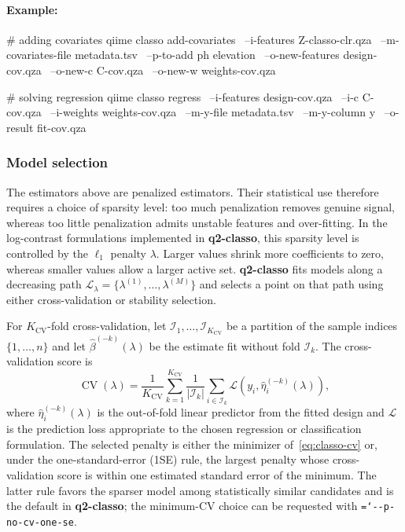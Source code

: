 \documentclass[11pt,a4paper]{article}
\newcommand{\code}[1]{\allowbreak\texttt{\hyphenchar\font=`\-\relax #1}}
\newcommand{\pkg}[1]{\textbf{#1}}
\newcommand{\bbeta}{\beta}
\begin{document}
\paragraph{Example:} \mbox{}
\begin{PseudoCode}
# adding covariates
qiime classo add-covariates \
    --i-features Z-classo-clr.qza \
    --m-covariates-file metadata.tsv \
    --p-to-add ph elevation \
    --o-new-features design-cov.qza \
    --o-new-c C-cov.qza \
    --o-new-w weights-cov.qza

# solving regression
qiime classo regress \
    --i-features design-cov.qza \
    --i-c C-cov.qza \
    --i-weights weights-cov.qza \
    --m-y-file metadata.tsv \
    --m-y-column y \
    --o-result fit-cov.qza
\end{PseudoCode}

\subsubsection{Model selection}
\label{sec:classo-model-selection}

The estimators above are penalized estimators. Their statistical use therefore
requires a choice of sparsity level: too much penalization removes genuine
signal, whereas too little penalization admits unstable features and
over-fitting. In the log-contrast formulations implemented in \pkg{q2-classo},
this sparsity level is controlled by the $\ell_1$ penalty $\lambda$. Larger
values shrink more coefficients to zero, whereas smaller values allow a larger
active set. \pkg{q2-classo} fits models along a decreasing path
$\mathcal{L}_{\lambda}=\{\lambda^{(1)},\ldots,\lambda^{(M)}\}$ and selects a point on that path
using either cross-validation or stability selection.

For $K_{\mathrm{CV}}$-fold cross-validation, let
$\mathcal{I}_1,\ldots,\mathcal{I}_{K_{\mathrm{CV}}}$ be a partition of the sample indices
$\{1,\ldots,n\}$ and let $\widehat{\bbeta}^{(-k)}(\lambda)$ be the estimate fit
without fold $\mathcal{I}_k$. The cross-validation score is
\begin{equation}
\label{eq:classo-cv}
\operatorname{CV}(\lambda) =
\frac{1}{K_{\mathrm{CV}}}\sum_{k=1}^{K_{\mathrm{CV}}}
\frac{1}{|\mathcal{I}_k|}
\sum_{i\in\mathcal{I}_k}
\mathcal{L}\!\left(y_i, \widehat{\eta}^{(-k)}_i(\lambda)\right),
\end{equation}
where $\widehat{\eta}^{(-k)}_i(\lambda)$ is the out-of-fold linear predictor
from the fitted design and $\mathcal{L}$ is the prediction loss appropriate to
the chosen regression or classification formulation. The selected
penalty is either the minimizer of~\eqref{eq:classo-cv} or, under the
one-standard-error (1SE) rule, the largest penalty whose cross-validation score is
within one estimated standard error of the minimum. The latter rule favors the
sparser model among statistically similar candidates and is the default in
\pkg{q2-classo}; the minimum-CV choice can be requested with
\code{-{}-p-no-cv-one-se}.
\end{document}
